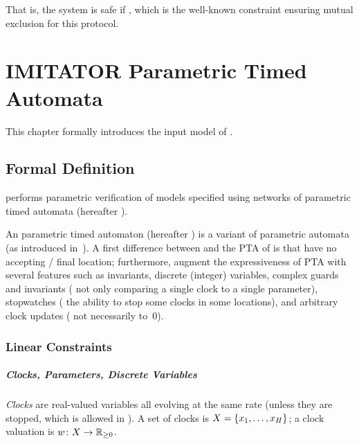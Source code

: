That is, the system is safe if , which is the well-known constraint ensuring mutual exclusion for this protocol.




\chapter{IMITATOR Parametric Timed Automata}\label{section:IPTA}


This chapter formally introduces the input model of \imitator{}.

\section{Formal Definition}\label{section:NIPTA}

\imitator{} performs parametric verification of models specified using networks of \imitator{} parametric timed automata (hereafter \NIPTA{}).

An \imitator{} parametric timed automaton (hereafter \IPTA{}) is a variant of parametric automata (as introduced in~\cite{AHV93}).
A first difference between \IPTA{} and the PTA of \cite{AHV93} is that \IPTA{} have no accepting / final location;
furthermore, \IPTA{} augment the expressiveness of PTA with several features such as invariants, discrete (integer) variables, complex guards and invariants (\ie{} not only comparing a single clock to a single parameter), stopwatches (\ie{} the ability to stop some clocks in some locations), and arbitrary clock updates (\ie{} not necessarily to~0).


\subsection{Linear Constraints}


\paragraph{Clocks, Parameters, Discrete Variables}
\emph{Clocks} are real-valued variables all evolving at the same rate (unless they are stopped, which is allowed in \imitator{}).
A set of clocks is $X = \{ x_1, \dots, x_H \}$;
a clock valuation is
$w \colon X \rightarrow {\mathbb R}_{\geq 0}$.

